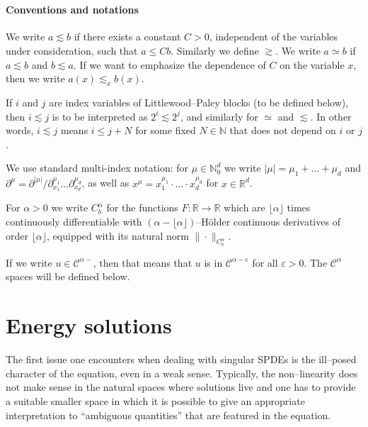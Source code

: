\documentclass[a4paper,11pt]{article}
\newcommand{\cdummy}{\cdot}
\newcommand{\CC}{\mathscr{C}}
\begin{document}
\ \



\paragraph{Conventions and notations}We write $a \lesssim b$ if there exists
a constant $C > 0$, independent of the variables under consideration, such
that $a \leqslant C b$. Similarly we define $\gtrsim$. We write $a \simeq b$
if $a \lesssim b$ and $b \lesssim a$. If we want to emphasize the dependence
of $C$ on the variable $x$, then we write $a (x) \lesssim_x b (x)$.

If $i$ and $j$ are index variables of Littlewood--Paley blocks (to be defined
below), then $i \lesssim j$ is to be interpreted as $2^i \lesssim 2^j$, and
similarly for $\simeq$ and $\lesssim$. In other words, $i \lesssim j$ means $i
\leqslant j + N$ for some fixed $N \in \mathbb{N}$ that does not depend on
$i$ or $j$.

We use standard multi-index notation: for ${\mu} \in \mathbb{N}^d_0$ we
write $| {\mu} | ={\mu}_1 + \ldots +{\mu}_d$ and
$\partial^{{\mu}} = \partial^{| {\mu} |} /
\partial^{{\mu}_1}_{x_1} \ldots \partial^{{\mu}_d}_{x_d}$, as well as
$x^{{\mu}} = x^{{\mu}_1}_1 \cdummy \ldots \cdummy x^{{\mu}_d}_d$
for $x \in \mathbb{R}^d$.

For $\alpha > 0$ we write $C^{\alpha}_b$ for the functions $F : \mathbb{R}
\rightarrow \mathbb{R}$ which are $\lfloor \alpha \rfloor$ times continuously
differentiable with $(\alpha - \lfloor \alpha \rfloor)$--H{\"o}lder continuous
derivatives of order $\lfloor \alpha \rfloor$, equipped with its natural norm
$\| \cdummy \|_{C^{\alpha}_b}$.

If we write $u \in \CC^{\alpha -}$, then that means that $u$ is in
$\CC^{\alpha - \varepsilon}$ for all $\varepsilon > 0$. The $\CC^{\alpha}$
spaces will be defined below.

\section{Energy solutions}\label{sec:energy}

The first issue one encounters when dealing with singular SPDEs is the
ill--posed character of the equation, even in a weak sense. Typically, the
non--linearity does not make sense in the natural spaces where solutions live
and one has to provide a suitable smaller space in which it is possible to
give an appropriate interpretation to ``ambiguous quantities'' that are
featured in the equation.
\end{document}
